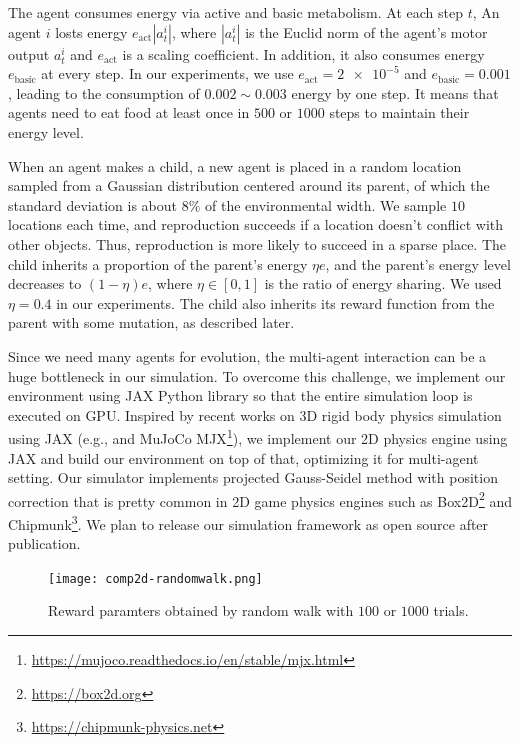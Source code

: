 The agent consumes energy via active and basic metabolism. At each step $t$, An agent $i$ losts energy $e_{\mathrm{act}} |a_{t}^{i}|$, where $|a_{t}^{i}|$ is the Euclid norm of the agent's motor output $a_{t}^{i}$ and $e_{\mathrm{act}}$ is a scaling coefficient. In addition, it also consumes energy $e_{\mathrm{basic}}$ at every step. In our experiments, we use $e_{\mathrm{act}} = \num{2e-5}$ and $e_{\mathrm{basic}} = 0.001$, leading to the consumption of $0.002 \sim 0.003$ energy by one step. It means that agents need to eat food at least once in $500$ or $1000$ steps to maintain their energy level.

When an agent makes a child, a new agent is placed in a random location sampled from a Gaussian distribution centered around its parent, of which the standard deviation is about $8\%$ of the environmental width. We sample $10$ locations each time, and reproduction succeeds if a location doesn't conflict with other objects. Thus, reproduction is more likely to succeed in a sparse place. The child inherits a proportion of the parent's energy $\eta e$, and the parent's energy level decreases to $(1-\eta)e$, where $\eta \in [0, 1]$ is the ratio of energy sharing. We used $\eta = 0.4$ in our experiments. The child also inherits its reward function from the parent with some mutation, as described later.

Since we need many agents for evolution, the multi-agent interaction can be a huge bottleneck in our simulation. To overcome this challenge, we implement our environment using JAX Python library \citep{jax2018github} so that the entire simulation loop is executed on GPU. Inspired by recent works on 3D rigid body physics simulation using JAX (e.g., \citet{brax2021github} and MuJoCo \citep{todorov2012mujoco} MJX\footnote{\url{https://mujoco.readthedocs.io/en/stable/mjx.html}}), we implement our 2D physics engine using JAX and build our environment on top of that, optimizing it for multi-agent setting. Our simulator implements projected Gauss-Seidel method with position correction \citep{catto2005iterative} that is pretty common in 2D game physics engines such as Box2D\footnote{\url{https://box2d.org}} and Chipmunk\footnote{\url{https://chipmunk-physics.net}}. We plan to release our simulation framework as open source after publication.

\begin{figure}[t]
  \centering
  \texttt{[image: comp2d-randomwalk.png]}
  \caption{Reward paramters obtained by random walk with $100$ or $1000$ trials.}\label{figure:rew-random}
\end{figure}

